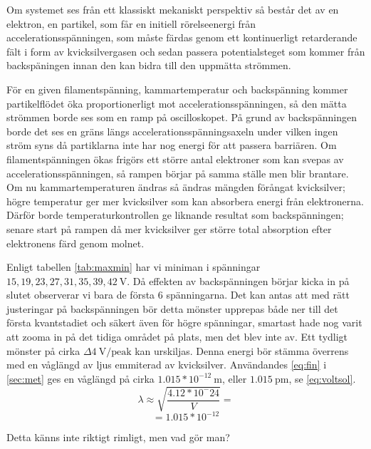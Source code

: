 Om systemet ses från ett klassiskt mekaniskt perspektiv så består det av en elektron, en partikel, som får en initiell rörelseenergi från accelerationsspänningen, som måste färdas genom ett kontinuerligt retarderande fält i form av kvicksilvergasen och sedan passera potentialsteget som kommer från backspäningen innan den kan bidra till den uppmätta strömmen. 

För en given filamentspänning, kammartemperatur och backspänning kommer partikelflödet öka proportionerligt mot accelerationsspänningen, så den mätta strömmen borde ses som en ramp på oscilloskopet. På grund av backspänningen borde det ses en gräns längs accelerationsspänningsaxeln under vilken ingen ström syns då partiklarna inte har nog energi för att passera barriären. Om filamentspänningen ökas frigörs ett större antal elektroner som kan svepas av accelerationsspänningen, så rampen börjar på samma ställe men blir brantare. Om nu kammartemperaturen ändras så ändras mängden förångat kvicksilver; högre temperatur ger mer kvicksilver som kan absorbera energi från elektronerna. Därför borde temperaturkontrollen ge liknande resultat som backspänningen; senare start på rampen då mer kvicksilver ger större total absorption efter elektronens färd genom molnet.


Enligt tabellen \cref{tab:maxmin} har vi miniman i spänningar $15, 19, 23, 27, 31, 35, 39, 42~\textrm{V}$. Då effekten av backspänningen börjar kicka in på slutet observerar vi bara de första $6$ spänningarna. Det kan antas att med rätt justeringar på backspänningen bör detta mönster upprepas både ner till det första kvantstadiet och säkert även för högre spänningar, smartast hade nog varit att zooma in på det tidiga området på plats, men det blev inte av. Ett tydligt mönster på cirka $\Delta 4~\textrm{V/peak}$ kan urskiljas. Denna energi bör stämma överrens med en våglängd av ljus emmiterad av kvicksilver. Användandes \cref{eq:fin} i \cref{sec:met} ges en våglängd på cirka $1.015*10^{-12}~\textrm{m}$, eller $1.015~\textrm{pm}$, se \cref{eq:voltsol}. %
\[\lambda \approx \sqrt{\frac{4.12*10^-24}{V}} = \]
\begin{equation}\label{eq:voltsol} = 1.015*10^{-12}\end{equation}

Detta känns inte riktigt rimligt, men vad gör man?

